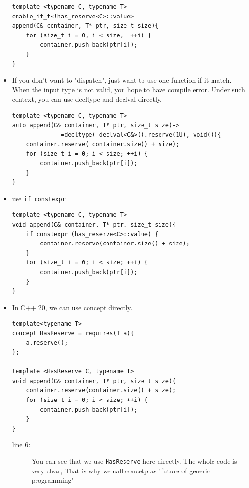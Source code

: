 \documentclass[a4paper,11pt,twoside]{book}
\begin{document}
\begin{itemize}
\begin{lstlisting}
template <typename C, typename T>
enable_if_t<!has_reserve<C>::value>
append(C& container, T* ptr, size_t size){
	for (size_t i = 0; i < size;  ++i) {
        container.push_back(ptr[i]); 
    }
}
\end{lstlisting}

	\item If you don't want to "dispatch", just want to use one function if it match.  When the input type is not valid, you hope to have compile error. Under such context, you can use decltype and declval directly.

\begin{lstlisting}[numbers=none]
template <typename C, typename T>
auto append(C& container, T* ptr, size_t size)-> 
              =decltype( declval<C&>().reserve(1U), void()){
	container.reserve( container.size() + size);
	for (size_t i = 0; i < size; ++i) {
		container.push_back(ptr[i]);
	}
}
\end{lstlisting}

\item use \texttt{if constexpr}
\begin{lstlisting}
template <typename C, typename T>
void append(C& container, T* ptr, size_t size){
    if constexpr (has_reserve<C>::value) {
        container.reserve(container.size() + size);
    }
    for (size_t i = 0; i < size; ++i) {
        container.push_back(ptr[i]);
    }
}   
\end{lstlisting}
\item In C++ 20, we can use concept directly.
\begin{lstlisting}
template<typename T>
concept HasReserve = requires(T a){
    a.reserve();
};

template <HasReserve C, typename T>
void append(C& container, T* ptr, size_t size){
    container.reserve(container.size() + size);
    for (size_t i = 0; i < size; ++i) {
        container.push_back(ptr[i]);
    }
} 
\end{lstlisting}
\begin{description}
    \item[line 6:] You can see that we use \texttt{HasReserve} here directly. The whole code is very clear, That is why we call concetp as "future of generic programming" 
\end{description}



\end{itemize}
\end{document}
